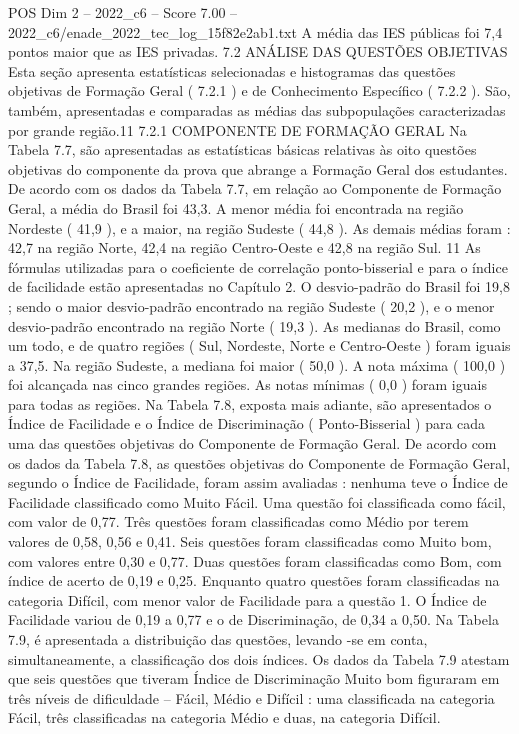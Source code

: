 \begin{textsample}{POS Dim 2 – 2022\_c6 – Score 7.00 – 2022\_c6/enade\_2022\_tec\_log\_15f82e2ab1.txt}
A média das IES públicas foi 7,4 pontos maior que as IES privadas. 7.2 ANÁLISE DAS QUESTÕES OBJETIVAS Esta seção apresenta estatísticas selecionadas e histogramas das questões objetivas de Formação Geral ( 7.2.1 ) e de Conhecimento Específico ( 7.2.2 ).
São, também, apresentadas e comparadas as médias das subpopulações caracterizadas por grande região.11 7.2.1 COMPONENTE DE FORMAÇÃO GERAL Na Tabela 7.7, são apresentadas as estatísticas básicas relativas às oito questões objetivas do componente da prova que abrange a Formação Geral dos estudantes.
De acordo com os dados da Tabela 7.7, em relação ao Componente de Formação Geral, a média do Brasil foi 43,3.
A menor média foi encontrada na região Nordeste ( 41,9 ), e a maior, na região Sudeste ( 44,8 ).
As demais médias foram : 42,7 na região Norte, 42,4 na região Centro-Oeste e 42,8 na região Sul. 11 As fórmulas utilizadas para o coeficiente de correlação ponto-bisserial e para o índice de facilidade estão apresentadas no Capítulo 2.
O desvio-padrão do Brasil foi 19,8 ; sendo o maior desvio-padrão encontrado na região Sudeste ( 20,2 ), e o menor desvio-padrão encontrado na região Norte ( 19,3 ).
As medianas do Brasil, como um todo, e de quatro regiões ( Sul, Nordeste, Norte e Centro-Oeste ) foram iguais a 37,5.
Na região Sudeste, a mediana foi maior ( 50,0 ).
A nota máxima ( 100,0 ) foi alcançada nas cinco grandes regiões.
As notas mínimas ( 0,0 ) foram iguais para todas as regiões.
Na Tabela 7.8, exposta mais adiante, são apresentados o Índice de Facilidade e o Índice de Discriminação ( Ponto-Bisserial ) para cada uma das questões objetivas do Componente de Formação Geral.
De acordo com os dados da Tabela 7.8, as questões objetivas do Componente de Formação Geral, segundo o Índice de Facilidade, foram assim avaliadas : nenhuma teve o Índice de Facilidade classificado como Muito Fácil.
Uma questão foi classificada como fácil, com valor de 0,77.
Três questões foram classificadas como Médio por terem valores de 0,58, 0,56 e 0,41.
Seis questões foram classificadas como Muito bom, com valores entre 0,30 e 0,77.
Duas questões foram classificadas como Bom, com índice de acerto de 0,19 e 0,25.
Enquanto quatro questões foram classificadas na categoria Difícil, com menor valor de Facilidade para a questão 1.
O Índice de Facilidade variou de 0,19 a 0,77 e o de Discriminação, de 0,34 a 0,50.
Na Tabela 7.9, é apresentada a distribuição das questões, levando -se em conta, simultaneamente, a classificação dos dois índices.
Os dados da Tabela 7.9 atestam que seis questões que tiveram Índice de Discriminação Muito bom figuraram em três níveis de dificuldade – Fácil, Médio e Difícil : uma classificada na categoria Fácil, três classificadas na categoria Médio e duas, na categoria Difícil.

\end{textsample}

